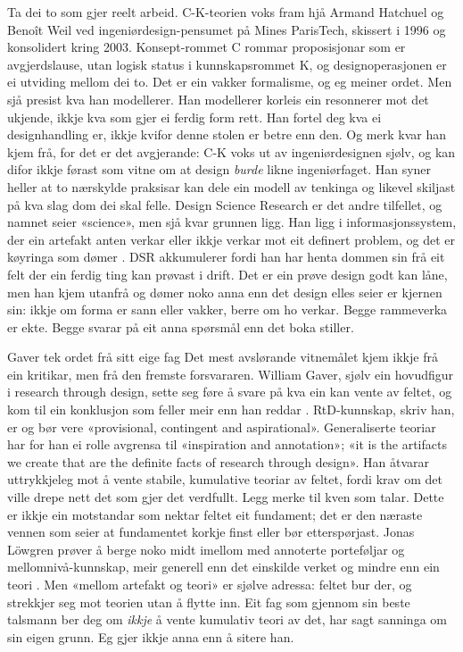 Ta dei to som gjer reelt arbeid. C-K-teorien voks fram hjå Armand Hatchuel og Benoît Weil ved ingeniørdesign-pensumet på Mines ParisTech, skissert i 1996 og konsolidert kring 2003. Konsept-rommet C rommar proposisjonar som er avgjerdslause, utan logisk status i kunnskapsrommet K, og designoperasjonen er ei utviding mellom dei to. Det er ein vakker formalisme, og eg meiner ordet. Men sjå presist kva han modellerer. Han modellerer korleis ein resonnerer mot det ukjende, ikkje kva som gjer ei ferdig form rett. Han fortel deg kva ei designhandling er, ikkje kvifor denne stolen er betre enn den. Og merk kvar han kjem frå, for det er det avgjerande: C-K voks ut av ingeniørdesignen sjølv, og kan difor ikkje førast som vitne om at design \emph{burde} likne ingeniørfaget. Han syner heller at to nærskylde praksisar kan dele ein modell av tenkinga og likevel skiljast på kva slag dom dei skal felle. Design Science Research er det andre tilfellet, og namnet seier «science», men sjå kvar grunnen ligg. Han ligg i informasjonssystem, der ein artefakt anten verkar eller ikkje verkar mot eit definert problem, og det er køyringa som dømer \autocite{hevner2004dsr}. DSR akkumulerer fordi han har henta dommen sin frå eit felt der ein ferdig ting kan prøvast i drift. Det er ein prøve design godt kan låne, men han kjem utanfrå og dømer noko anna enn det design elles seier er kjernen sin: ikkje om forma er sann eller vakker, berre om ho verkar. Begge rammeverka er ekte. Begge svarar på eit anna spørsmål enn det boka stiller.

\begin{kasus}{Gaver tek ordet frå sitt eige fag}
Det mest avslørande vitnemålet kjem ikkje frå ein kritikar, men frå den fremste forsvararen. William Gaver, sjølv ein hovudfigur i research through design, sette seg føre å svare på kva ein kan vente av feltet, og kom til ein konklusjon som feller meir enn han reddar \autocite{gaver2012what}. RtD-kunnskap, skriv han, er og bør vere «provisional, contingent and aspirational». Generaliserte teoriar har for han ei rolle avgrensa til «inspiration and annotation»; «it is the artifacts we create that are the definite facts of research through design». Han åtvarar uttrykkjeleg mot å vente stabile, kumulative teoriar av feltet, fordi krav om det ville drepe nett det som gjer det verdfullt. Legg merke til kven som talar. Dette er ikkje ein motstandar som nektar feltet eit fundament; det er den næraste vennen som seier at fundamentet korkje finst eller bør etterspørjast. Jonas Löwgren prøver å berge noko midt imellom med annoterte porteføljar og mellomnivå-kunnskap, meir generell enn det einskilde verket og mindre enn ein teori \autocite{lowgren2013intermediate}. Men «mellom artefakt og teori» er sjølve adressa: feltet bur der, og strekkjer seg mot teorien utan å flytte inn. Eit fag som gjennom sin beste talsmann ber deg om \emph{ikkje} å vente kumulativ teori av det, har sagt sanninga om sin eigen grunn. Eg gjer ikkje anna enn å sitere han.
\end{kasus}

